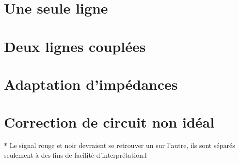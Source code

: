 \documentclass{udes_rapport} %
\numberwithin{equation}{section}
\begin{document}




\begin{titlepage}
\end{titlepage}
\newpage

\tableofcontents
\newpage
\listoffigures
\newpage

\setcounter{page}{1} %

\section{Une seule ligne}

\section{Deux lignes couplées}

\section{Adaptation d'impédances}

\section{Correction de circuit non idéal}


\appendix
{}
\label{Ann:bounce}

* Le signal rouge et noir devraient se retrouver un sur l'autre, ils sont séparés seulement à des fins de facilité d'interprétation.l
\end{document}
